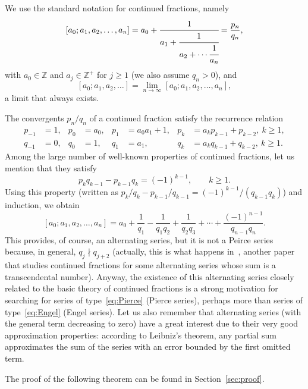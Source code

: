 \documentclass[11pt, a4paper]{amsart}
\newcommand{\Z}{\mathbb{Z}}
\newcommand{\Zp}{\mathbb{Z}^{+}}
\theoremstyle{plain}
\theoremstyle{remark}
\begin{document}
We use the standard notation \cite{Cas, Hua, Khin, NZM, Var} for continued fractions, namely 
\[
  [a_0;a_1,a_2,\dots,a_n]
  = a_0 + \cfrac{1}{ a_1 + \cfrac{1}{ a_2 + \cdots \cfrac{1}{a_n} } }
  = \frac{p_n}{q_n},
\]
with $a_0 \in \Z$ and $a_j \in \Zp$ for $j \ge 1$ (we also assume $q_n>0$), and 
\[
  [a_0;a_1,a_2,\dots] = \lim_{n\to\infty} [a_0;a_1,a_2,\dots,a_n],
\]
a limit that always exists.

The convergents $p_n/q_n$ of a continued fraction satisfy the recurrence relation
\begin{equation}
\label{eq:fcpkqk}
\begin{aligned}
  p_{-1} &= 1, & p_0 &= a_0, & p_1 &= a_0a_1+1, & p_k &= a_kp_{k-1}+p_{k-2},\ k \ge 1,\\
  q_{-1} &= 0, & q_0 &= 1, & q_1 &= a_1, & q_k &= a_kq_{k-1}+q_{k-2},\ k \ge 1.
\end{aligned}
\end{equation}
Among the large number of well-known properties of continued fractions, let us mention that
they satisfy 
\[
  p_k q_{k-1} - p_{k-1} q_k = (-1)^{k-1}, \qquad k \ge 1.
\]
Using this property (written as $p_k/q_k - p_{k-1}/q_{k-1} = (-1)^{k-1}/(q_{k-1}q_k)$) and induction, we obtain
\begin{equation}
\label{eq:fcaltqk}
  [a_0;a_1,a_2,\dots,a_n]
  = a_0 + \frac{1}{q_1} - \frac{1}{q_1q_2} + \frac{1}{q_2q_3}
  + \cdots + \frac{(-1)^{n-1}}{q_{n-1}q_n}.
\end{equation}
This provides, of course, an alternating series, but it is not a Peirce
series because, in general, $q_j \nmid q_{j+2}$
(actually, this is what happens in~\cite{DaSha}, another paper that
studies continued fractions for some alternating series whose
sum is a transcendental number).
Anyway, the existence of this alternating series closely related
to the basic theory of continued fractions is a strong motivation for searching for 
series of type~\eqref{eq:Pierce} (Pierce series), perhaps more than
series of type~\eqref{eq:Engel} (Engel series).
Let us also remember that alternating series (with the general term
decreasing to zero) have a great interest due to their very good approximation 
properties: according to Leibniz's theorem, any partial sum approximates the
sum of the series with an error bounded by the first omitted term.

The proof of the following theorem can be found in Section~\ref{sec:proof}.
\end{document}
